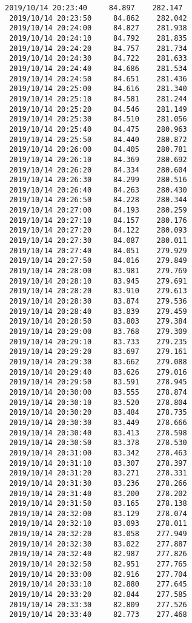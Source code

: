 \documentclass[11pt]{article}
\begin{document}
\begin{Verbatim}[commandchars=\\\{\}]
 2019/10/14 20:23:40     84.897    282.147
 2019/10/14 20:23:50     84.862    282.042
 2019/10/14 20:24:00     84.827    281.938
 2019/10/14 20:24:10     84.792    281.835
 2019/10/14 20:24:20     84.757    281.734
 2019/10/14 20:24:30     84.722    281.633
 2019/10/14 20:24:40     84.686    281.534
 2019/10/14 20:24:50     84.651    281.436
 2019/10/14 20:25:00     84.616    281.340
 2019/10/14 20:25:10     84.581    281.244
 2019/10/14 20:25:20     84.546    281.149
 2019/10/14 20:25:30     84.510    281.056
 2019/10/14 20:25:40     84.475    280.963
 2019/10/14 20:25:50     84.440    280.872
 2019/10/14 20:26:00     84.405    280.781
 2019/10/14 20:26:10     84.369    280.692
 2019/10/14 20:26:20     84.334    280.604
 2019/10/14 20:26:30     84.299    280.516
 2019/10/14 20:26:40     84.263    280.430
 2019/10/14 20:26:50     84.228    280.344
 2019/10/14 20:27:00     84.193    280.259
 2019/10/14 20:27:10     84.157    280.176
 2019/10/14 20:27:20     84.122    280.093
 2019/10/14 20:27:30     84.087    280.011
 2019/10/14 20:27:40     84.051    279.929
 2019/10/14 20:27:50     84.016    279.849
 2019/10/14 20:28:00     83.981    279.769
 2019/10/14 20:28:10     83.945    279.691
 2019/10/14 20:28:20     83.910    279.613
 2019/10/14 20:28:30     83.874    279.536
 2019/10/14 20:28:40     83.839    279.459
 2019/10/14 20:28:50     83.803    279.384
 2019/10/14 20:29:00     83.768    279.309
 2019/10/14 20:29:10     83.733    279.235
 2019/10/14 20:29:20     83.697    279.161
 2019/10/14 20:29:30     83.662    279.088
 2019/10/14 20:29:40     83.626    279.016
 2019/10/14 20:29:50     83.591    278.945
 2019/10/14 20:30:00     83.555    278.874
 2019/10/14 20:30:10     83.520    278.804
 2019/10/14 20:30:20     83.484    278.735
 2019/10/14 20:30:30     83.449    278.666
 2019/10/14 20:30:40     83.413    278.598
 2019/10/14 20:30:50     83.378    278.530
 2019/10/14 20:31:00     83.342    278.463
 2019/10/14 20:31:10     83.307    278.397
 2019/10/14 20:31:20     83.271    278.331
 2019/10/14 20:31:30     83.236    278.266
 2019/10/14 20:31:40     83.200    278.202
 2019/10/14 20:31:50     83.165    278.138
 2019/10/14 20:32:00     83.129    278.074
 2019/10/14 20:32:10     83.093    278.011
 2019/10/14 20:32:20     83.058    277.949
 2019/10/14 20:32:30     83.022    277.887
 2019/10/14 20:32:40     82.987    277.826
 2019/10/14 20:32:50     82.951    277.765
 2019/10/14 20:33:00     82.916    277.704
 2019/10/14 20:33:10     82.880    277.645
 2019/10/14 20:33:20     82.844    277.585
 2019/10/14 20:33:30     82.809    277.526
 2019/10/14 20:33:40     82.773    277.468

\end{Verbatim}
\end{document}
